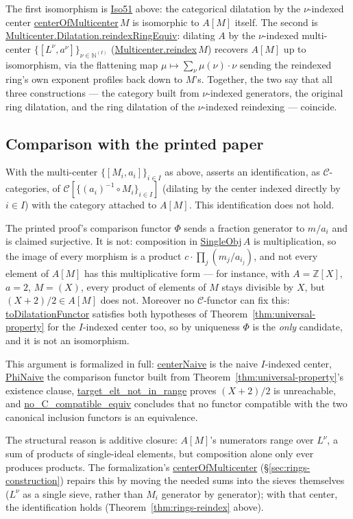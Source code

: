 \documentclass[11pt]{amsart}
\newcommand{\lc}[1]{\url{#1}}
\theoremstyle{plain}
\theoremstyle{definition}
\theoremstyle{remark}
\newcommand{\calC}{\mathcal C}
\begin{document}
The first isomorphism is \lc{Iso51} above: the categorical dilatation by the $\nu$-indexed
center \lc{centerOfMulticenter}$\,M$ is isomorphic to $A[M]$ itself. The second is
\lc{Multicenter.Dilatation.reindexRingEquiv}: dilating $A$ by the $\nu$-indexed multi-center
$\{[L^\nu,a^\nu]\}_{\nu\in\mathbb N^{(I)}}$ (\lc{Multicenter.reindex}$\,M$) recovers $A[M]$ up to
isomorphism, via the flattening map $\mu\mapsto\sum_\nu \mu(\nu)\cdot\nu$ sending the reindexed
ring's own exponent profiles back down to $M$'s. Together, the two say that all three
constructions --- the category built from $\nu$-indexed generators, the original ring
dilatation, and the ring dilatation of the $\nu$-indexed reindexing --- coincide.

\subsection{Comparison with the printed paper}
\label{sec:rings-gap}

With the multi-center $\{[M_i,a_i]\}_{i\in I}$ as above, \citep[Proposition~5.1]{Mayeux}
asserts an identification, as $\calC$-categories, of $\calC[\{(a_i)^{-1}\circ M_i\}_{i\in I}]$
(dilating by the center indexed directly by $i\in I$) with the category attached to $A[M]$.
This identification does not hold.

The printed proof's comparison functor $\Phi$ sends a fraction generator to $m/a_i$ and is
claimed surjective. It is not: composition in \lc{SingleObj}$\,A$ is multiplication, so the
image of every morphism is a product $c\cdot\prod_j(m_j/a_{i_j})$, and not every element of
$A[M]$ has this multiplicative form --- for instance, with $A=\mathbb Z[X]$, $a=2$, $M=(X)$,
every product of elements of $M$ stays divisible by $X$, but $(X+2)/2 \in A[M]$ does not.
Moreover no $\calC$-functor can fix this: \lc{toDilatationFunctor} satisfies both hypotheses
of Theorem~\ref{thm:universal-property} for the $I$-indexed center too, so by uniqueness
$\Phi$ is the \emph{only} candidate, and it is not an isomorphism.

This argument is formalized in full: \lc{centerNaive} is the naive $I$-indexed center,
\lc{PhiNaive} the comparison functor built from Theorem~\ref{thm:universal-property}'s
existence clause, \lc{target_elt_not_in_range} proves $(X+2)/2$ is unreachable, and
\lc{no_C_compatible_equiv} concludes that no functor compatible with the two canonical
inclusion functors is an equivalence.

The structural reason is additive closure: $A[M]$'s numerators range over $L^\nu$, a sum of
products of single-ideal elements, but composition alone only ever produces products. The
formalization's \lc{centerOfMulticenter} (\S\ref{sec:rings-construction}) repairs this by
moving the needed sums into the sieves themselves ($L^\nu$ as a single sieve, rather than
$M_i$ generator by generator); with that center, the identification holds
(Theorem~\ref{thm:rings-reindex} above).
\end{document}

